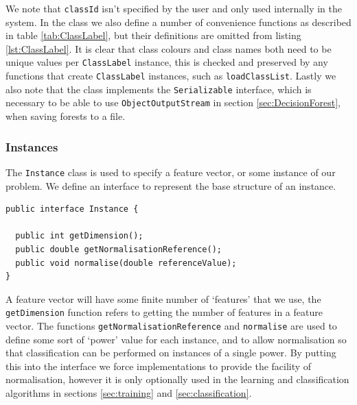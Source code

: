 \documentclass[12pt,twoside,notitlepage]{report}
\begin{document}
                We note that \texttt{classId} isn't specified by the user and only used internally in the system. In the 
                class we also define a number of convenience functions as described in table \ref{tab:ClassLabel}, but 
                their definitions are omitted from listing \ref{lst:ClassLabel}. It is clear that class colours and 
                class names both need to be unique values per \texttt{ClassLabel} instance, this is checked and 
                preserved by any functions that create \texttt{ClassLabel} instances, such as \texttt{loadClassList}. 
                Lastly we also note that the class implements the \texttt{Serializable} interface, which is necessary 
                to be able to use \texttt{ObjectOutputStream} in section \ref{sec:DecisionForest}, when saving forests 
                to a file.




            \subsubsection{Instances}
                The \texttt{Instance} class is used to specify a feature vector, or some instance of our problem. We 
                define an interface to represent the base structure of an instance. 

                \begin{lstlisting}[caption={The \texttt{Instance} declaration, an interface any concrete instance 
                class should at least present.},label={lst:Instance}]
public interface Instance {

  public int getDimension();
  public double getNormalisationReference(); 
  public void normalise(double referenceValue);
}
                \end{lstlisting}

                A feature vector will have some finite number of `features' that we use, the \texttt{getDimension} 
                function refers to getting the number of features in a feature vector. The functions 
                \texttt{getNormalisationReference} and \texttt{normalise} are used to define some sort of `power' value 
                for each instance, and to allow normalisation so that classification can be performed on instances of 
                a single power. By putting this into the interface we force implementations to provide the facility of 
                normalisation, however it is only optionally used in the learning and classification algorithms in 
                sections \ref{sec:training} and \ref{sec:classification}. 
\end{document}
